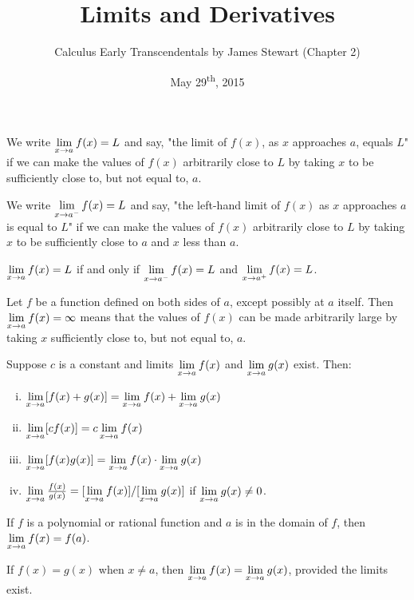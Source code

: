 \documentclass[a4paper,11pt]{article}
\title{Limits and Derivatives}
\author{Calculus Early Transcendentals by James Stewart (Chapter 2)}
\date{May 29\textsuperscript{th}, 2015}
\begin{document}
\maketitle
{}

\begin{outline}

    We write \(\xlimit{x}{a} f(x)=L\) and say, "the limit of \(f(x)\), as \(x\) approaches
    \(a\), equals \(L\)" if we can make the values of \(f(x)\) arbitrarily close to \(L\) by taking \(x\) 
    to be sufficiently close to, but not equal to, \(a\).
    
    We write \(\xlimit[-]{x}{a} f(x)=L\) and say, "the left-hand limit of \(f(x)\) as \(x\)
    approaches \(a\) is equal to \(L\)" if we can make the values of \(f(x)\) arbitrarily close to \(L\) by
    taking \(x\) to be sufficiently close to \(a\) and \(x\) less than \(a\).
    
    \(\xlimit{x}{a} f(x) = L\) if and only if \(\xlimit[-]{x}{a} f(x) = L\)
    and \(\xlimit[+]{x}{a} f(x) = L\).
    
    Let \(f\) be a function defined on both sides of \(a\), except possibly at \(a\) itself. Then
    \(\xlimit{x}{a} f(x) = \infty\) means that the values of \(f(x)\) can be made arbitrarily large 
    by taking \(x\) sufficiently close to, but not equal to, \(a\).
    
    Suppose \(c\) is a constant and limits \(\xlimit{x}{a} f(x)\) and \(\xlimit{x}{a} g(x)\) exist. Then:
    \begin{enumerate}[i.]
      \item 
        \(\xlimit{x}{a} [f(x) + g(x)] = \xlimit{x}{a} f(x) + \xlimit{x}{a} g(x)\)
      \item
        \(\xlimit{x}{a} [cf(x)] = c \xlimit{x}{a} f(x)\)
      \item
        \(\xlimit{x}{a} [f(x)g(x)] = \xlimit{x}{a} f(x) \cdot \xlimit{x}{a} g(x)\)
      \item
        \(\xlimit{x}{a} \frac{f(x)}{g(x)} = [\xlimit{x}{a}f(x)]/[\xlimit{x}{a}g(x)]\) if
        \(\xlimit{x}{a}g(x) \neq 0\).
    \end{enumerate}
    
    If \(f\) is a polynomial or rational function and \(a\) is in the domain of \(f\), then
    \(\xlimit{x}{a} f(x) = f(a)\).
    
    If \(f(x) = g(x)\) when \(x \neq a\), then \(\xlimit{x}{a}f(x) = \xlimit{x}{a}g(x)\), provided the
    limits exist.
    

\end{outline}
\end{document}
